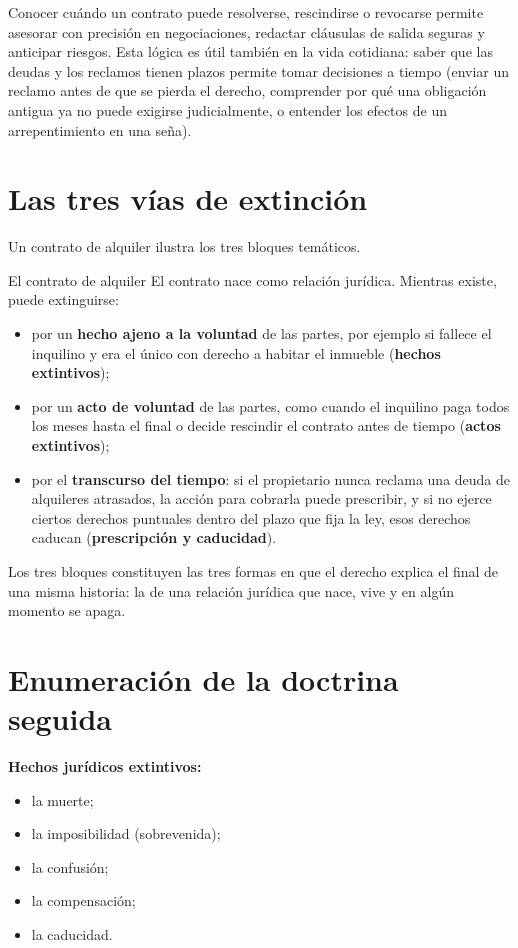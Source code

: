 \documentclass[12pt,oneside]{book}
\begin{document}
Conocer cuándo un contrato puede resolverse, rescindirse o revocarse permite asesorar con precisión en negociaciones, redactar cláusulas de salida seguras y anticipar riesgos. Esta lógica es útil también en la vida cotidiana: saber que las deudas y los reclamos tienen plazos permite tomar decisiones a tiempo (enviar un reclamo antes de que se pierda el derecho, comprender por qué una obligación antigua ya no puede exigirse judicialmente, o entender los efectos de un arrepentimiento en una seña).

\section{Las tres vías de extinción}

Un contrato de alquiler ilustra los tres bloques temáticos.

\begin{example}{El contrato de alquiler}
El contrato nace como relación jurídica. Mientras existe, puede extinguirse:
\begin{itemize}
    \item por un \textbf{hecho ajeno a la voluntad} de las partes, por ejemplo si fallece el inquilino y era el único con derecho a habitar el inmueble (\textbf{hechos extintivos});
    \item por un \textbf{acto de voluntad} de las partes, como cuando el inquilino paga todos los meses hasta el final o decide rescindir el contrato antes de tiempo (\textbf{actos extintivos});
    \item por el \textbf{transcurso del tiempo}: si el propietario nunca reclama una deuda de alquileres atrasados, la acción para cobrarla puede prescribir, y si no ejerce ciertos derechos puntuales dentro del plazo que fija la ley, esos derechos caducan (\textbf{prescripción y caducidad}).
\end{itemize}
\end{example}

Los tres bloques constituyen las tres formas en que el derecho explica el final de una misma historia: la de una relación jurídica que nace, vive y en algún momento se apaga.

\section{Enumeración de la doctrina seguida}

\textbf{Hechos jurídicos extintivos:}
\begin{itemize}
    \item la muerte;
    \item la imposibilidad (sobrevenida);
    \item la confusión;
    \item la compensación;
    \item la caducidad.
\end{itemize}
\end{document}
